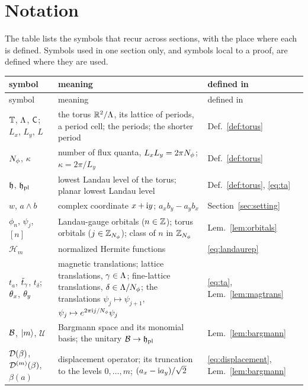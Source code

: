 \section{Notation}\label{app:notation}

The table lists the symbols that recur across sections, with the place where each is defined. Symbols used in one section
only, and symbols local to a proof, are defined where they are used.

\begingroup\small
\begin{longtable}{@{}>{\raggedright\arraybackslash}p{}>{\raggedright\arraybackslash}p{}>{\raggedright\arraybackslash}p{}@{}}
\toprule
symbol & meaning & defined in\\
\midrule
\endfirsthead
\toprule
symbol & meaning & defined in\\
\midrule
\endhead
\bottomrule
\endfoot
$\mathbb{T}$, $\Lambda$, $\mathsf{C}$; $L_x$, $L_y$, $L$ & the torus $\mathbb{R}^2/\Lambda$, its lattice of periods, a period cell; the periods; the shorter period
& Def.~\ref{def:torus}\\
$N_{\phi}$, $\kappa$ & number of flux quanta, $L_xL_y=2\pi N_{\phi}$; $\kappa=2\pi/L_y$ & Def.~\ref{def:torus}\\
$\mathfrak{h}$, $\mathfrak{h}_{\mathrm{pl}}$ & lowest Landau level of the torus; planar lowest Landau level & Def.~\ref{def:torus}, \eqref{eq:ta}\\
$w$, $a\wedge b$ & complex coordinate $x+\mathrm{i} y$; $a_xb_y-a_yb_x$ & Section~\ref{sec:setting}\\
$\phi_n$, $\psi_j$, $[n]$ & Landau-gauge orbitals ($n\in\mathbb{Z}$); torus orbitals ($j\in\mathbb{Z}_{N_{\phi}}$); class of $n$ in $\mathbb{Z}_{N_{\phi}}$
& Lem.~\ref{lem:orbitals}\\
$\mathcal H_m$ & normalized Hermite functions & \eqref{eq:landaurep}\\
$t_a$, $\tilde t_\gamma$, $t_\delta$; $\theta_x$, $\theta_y$ & magnetic translations; lattice translations, $\gamma\in\Lambda$; fine-lattice translations,
$\delta\in\Lambda/N_{\phi}$; the translations $\psi_j\mapsto\psi_{j+1}$, $\psi_j\mapsto e^{2\pi\mathrm{i} j/N_{\phi}}\psi_j$ & \eqref{eq:ta}, Lem.~\ref{lem:magtrans}\\
$\mathcal{B}$, $\lvert m\rangle$, $\mathcal U$ & Bargmann space and its monomial basis; the unitary $\mathcal{B}\to\mathfrak{h}_{\mathrm{pl}}$ & Lem.~\ref{lem:bargmann}\\
$\mathcal{D}(\beta)$, $\mathcal{D}^{(m)}(\beta)$, $\beta(a)$ & displacement operator; its truncation to the levels $0,\dots,m$;
$(a_x-\mathrm{i} a_y)/\sqrt2$ & \eqref{eq:displacement}, Lem.~\ref{lem:bargmann}\\

\end{longtable}

